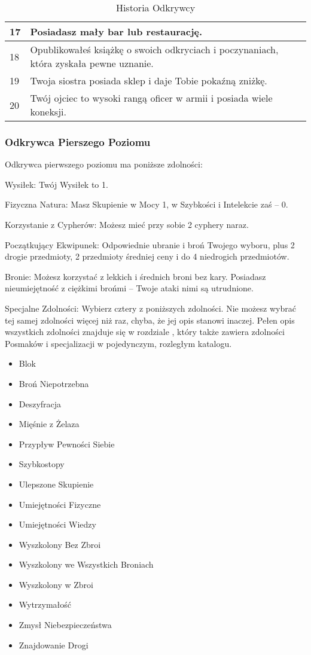 \begin{table*}[t]
\begin{tabularx}{\textwidth}{| p{} | X |}
    17 & Posiadasz mały bar lub restaurację. \\ \hline
    18 & Opublikowałeś książkę o swoich odkryciach i poczynaniach, która zyskała pewne uznanie. \\ \hline
    19 & Twoja siostra posiada sklep i daje Tobie pokaźną zniżkę. \\ \hline
    20 & Twój ojciec to wysoki rangą oficer w armii i posiada wiele koneksji. \\ \hline
 \end{tabularx}
  \caption {Historia Odkrywcy}
  \label {Historia Odkrywcy}
 \end{table*}
 
 \subsubsection{Odkrywca Pierszego Poziomu}
 
Odkrywca pierwszego poziomu ma poniższe zdolności:

Wysiłek: Twój Wysiłek to 1.

Fizyczna Natura: Masz Skupienie w Mocy 1, w Szybkości i Intelekcie zaś – 0.

Korzystanie z Cypherów: Możesz mieć przy sobie 2 cyphery naraz.

Początkujący Ekwipunek: Odpowiednie ubranie i broń Twojego wyboru, plus 2 drogie przedmioty, 2 przedmioty średniej ceny i do 4 niedrogich przedmiotów.

Bronie: Możesz korzystać z lekkich i średnich broni bez kary. Posiadasz nieumiejętność z ciężkimi brońmi – Twoje ataki nimi są utrudnione.

Specjalne Zdolności: Wybierz cztery z poniższych zdolności. Nie możesz wybrać tej samej zdolności więcej niż raz, chyba, że jej opis stanowi inaczej. Pełen opis wszystkich zdolności znajduje się w rozdziale , który także zawiera zdolności Posmaków i specjalizacji w pojedynczym, rozległym katalogu. 

\begin{itemize}
\item Blok
\item Broń Niepotrzebna
\item Deszyfracja
\item Mięśnie z Żelaza
\item Przypływ Pewności Siebie
\item Szybkostopy
\item Ulepszone Skupienie
\item Umiejętności Fizyczne
\item Umiejętności Wiedzy
\item Wyszkolony Bez Zbroi
\item Wyszkolony we Wszystkich Broniach
\item Wyszkolony w Zbroi
\item Wytrzymałość
\item Zmysł Niebezpieczeństwa
\item Znajdowanie Drogi
\end{itemize}

